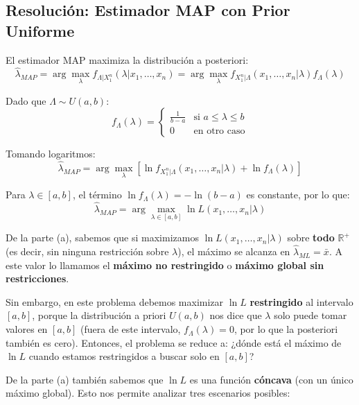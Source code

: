\documentclass[
  11pt,
  letterpaper,
   addpoints,
   answers
  ]{exam}
\begin{document}
\begin{questions}
\begin{parts}
\begin{solution}
\subsection*{Resolución: Estimador MAP con Prior Uniforme}

El estimador MAP maximiza la distribución a posteriori:
\begin{equation}
\hat{\lambda}_{MAP} = \arg\max_{\lambda} f_{\Lambda|X_1^n}(\lambda|x_1, \ldots, x_n) = \arg\max_{\lambda} f_{X_1^n|\Lambda}(x_1, \ldots, x_n|\lambda) f_{\Lambda}(\lambda)
\end{equation}

Dado que $\Lambda \sim U(a,b)$:
\begin{equation}
f_{\Lambda}(\lambda) = \begin{cases}
\frac{1}{b-a} & \text{si } a \leq \lambda \leq b\\
0 & \text{en otro caso}
\end{cases}
\end{equation}

Tomando logaritmos:
\begin{equation}
\hat{\lambda}_{MAP} = \arg\max_{\lambda} \left[\ln f_{X_1^n|\Lambda}(x_1, \ldots, x_n|\lambda) + \ln f_{\Lambda}(\lambda)\right]
\end{equation}

Para $\lambda \in [a,b]$, el término $\ln f_{\Lambda}(\lambda) = -\ln(b-a)$ es constante, por lo que:
\begin{equation}
\hat{\lambda}_{MAP} = \arg\max_{\lambda \in [a,b]} \ln L(x_1, \ldots, x_n|\lambda)
\end{equation}

De la parte (a), sabemos que si maximizamos $\ln L(x_1, \ldots, x_n|\lambda)$ sobre \textbf{todo} $\mathbb{R}^+$ (es decir, sin ninguna restricción sobre $\lambda$), el máximo se alcanza en $\hat{\lambda}_{ML} = \bar{x}$. A este valor lo llamamos el \textbf{máximo no restringido} o \textbf{máximo global sin restricciones}.

Sin embargo, en este problema debemos maximizar $\ln L$ \textbf{restringido} al intervalo $[a,b]$, porque la distribución a priori $U(a,b)$ nos dice que $\lambda$ solo puede tomar valores en $[a,b]$ (fuera de este intervalo, $f_{\Lambda}(\lambda) = 0$, por lo que la posteriori también es cero). Entonces, el problema se reduce a: ¿dónde está el máximo de $\ln L$ cuando estamos restringidos a buscar solo en $[a,b]$?

De la parte (a) también sabemos que $\ln L$ es una función \textbf{cóncava} (con un único máximo global). Esto nos permite analizar tres escenarios posibles:


\end{solution}
\end{parts}
\end{questions}
\end{document}
